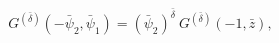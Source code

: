 \begin{equation}
G^{(\bar{\delta})}(-\bar{\psi}_{2},\bar{\psi}_{1})=(\bar{\psi}_{2})^{\bar{\delta}}~
G^{(\bar{\delta})}(-1,\bar{z}),
\end{equation}

